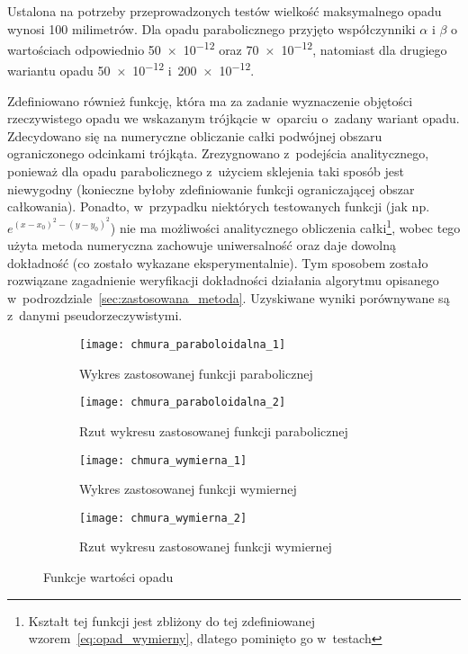 Ustalona na potrzeby przeprowadzonych testów wielkość maksymalnego opadu wynosi 100 milimetrów. Dla opadu parabolicznego przyjęto współczynniki $\alpha$ i $\beta$ o wartościach odpowiednio \num{50e-12} oraz \num{70e-12}, natomiast dla drugiego wariantu opadu \num{50e-12} i~\num{200e-12}. 


Zdefiniowano również funkcję, która ma za zadanie wyznaczenie objętości rzeczywistego opadu we wskazanym trójkącie w~oparciu o~zadany wariant opadu. Zdecydowano się na numeryczne obliczanie całki podwójnej obszaru ograniczonego odcinkami trójkąta. Zrezygnowano z~podejścia analitycznego, ponieważ dla opadu parabolicznego z~użyciem sklejenia taki sposób jest niewygodny (konieczne byłoby zdefiniowanie funkcji ograniczającej obszar całkowania). Ponadto, w~przypadku niektórych testowanych funkcji (jak np. $e^{(x-x_0)^2 - (y-y_0)^2}$) nie ma możliwości analitycznego obliczenia całki\footnote{Kształt tej funkcji jest zbliżony do tej zdefiniowanej wzorem~\ref{eq:opad_wymierny}, dlatego pominięto go w~testach}, wobec tego użyta metoda numeryczna zachowuje uniwersalność oraz daje dowolną dokładność (co zostało wykazane eksperymentalnie). Tym sposobem zostało rozwiązane zagadnienie weryfikacji dokładności działania algorytmu opisanego w~podrozdziale~\ref{sec:zastosowana_metoda}. Uzyskiwane wyniki porównywane są z~danymi pseudorzeczywistymi.

\begin{figure}[ht]
\centering
	\begin{subfigure}{.5\textwidth}
		\centering
		\texttt{[image: chmura\_paraboloidalna\_1]}
		\caption{Wykres zastosowanej funkcji parabolicznej}
		\label{fig:elipsa_3d}
	\end{subfigure}%
	\begin{subfigure}{0.5\textwidth}
		\centering
		\texttt{[image: chmura\_paraboloidalna\_2]}
		\caption{Rzut wykresu zastosowanej funkcji parabolicznej}
		\label{fig:elipsa_2d}
	\end{subfigure}	
	
	\begin{subfigure}{.5\textwidth}
		\centering
		\texttt{[image: chmura\_wymierna\_1]}
		\caption{Wykres zastosowanej funkcji wymiernej}
		\label{fig:elipsa_3d}
	\end{subfigure}%
	\begin{subfigure}{0.5\textwidth}
		\centering
		\texttt{[image: chmura\_wymierna\_2]}
		\caption{Rzut wykresu zastosowanej funkcji wymiernej}
		\label{fig:elipsa_2d}
	\end{subfigure}	
\caption{Funkcje wartości opadu}
\end{figure}

